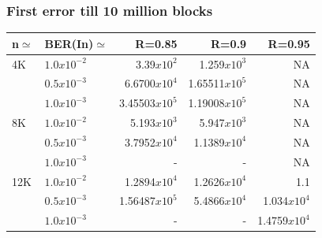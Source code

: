 \documentclass[xcolor=dvipsname]
{beamer}
\begin{document}
\begin{frame}[t] 
\frametitle{First error till 10 million blocks}

\begin{table}[]
\centering
\begin{tabular}{|l|l|r|r|r|}
\hline
n$\simeq$   & BER(In)$\simeq$    & R=0.85  & R=0.9 & R=0.95 \\ \hline
4K  & $1.0x10^{-2}$        & 3.39$x10^{2}$           & 1.259$x10^{3}$        & NA      \\ 
    & $0.5x10^{-3}$        & 6.6700$x10^{4}$        & 1.65511$x10^{5}$               & NA   \\ 
    & $1.0x10^{-3}$        & 3.45503$x10^{5}$        & 1.19008$x10^{5}$        & NA  \\ \hline
8K  & $1.0x10^{-2}$        & 5.193$x10^{3}$         & 5.947$x10^{3}$         & NA      \\ 
    & $0.5x10^{-3}$        & 3.7952$x10^{4}$        & 1.1389$x10^{4}$          & NA  \\ 
    & $1.0x10^{-3}$        & -             			& -               		 & NA             \\ \hline
12K & $1.0x10^{-2}$        & 1.2894$x10^{4}$        & 1.2626$x10^{4}$     & 1.1      \\ 
    & $0.5x10^{-3}$        & 1.56487$x10^{5}$      & 5.4866$x10^{4}$     & 1.034$x10^{4}$    \\ 
    & $1.0x10^{-3}$        & -			  			 & -           		& 1.4759$x10^{4}$   \\ \hline
      
\end{tabular}
\end{table}

\end{frame}

\end{document}
